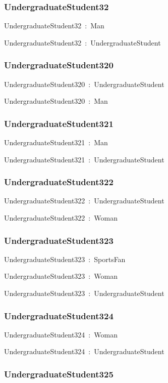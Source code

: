 \documentclass{article}
\begin{document}
\subsubsection*{UndergraduateStudent32}

UndergraduateStudent32~:~Man

UndergraduateStudent32~:~UndergraduateStudent

\subsubsection*{UndergraduateStudent320}

UndergraduateStudent320~:~UndergraduateStudent

UndergraduateStudent320~:~Man

\subsubsection*{UndergraduateStudent321}

UndergraduateStudent321~:~Man

UndergraduateStudent321~:~UndergraduateStudent

\subsubsection*{UndergraduateStudent322}

UndergraduateStudent322~:~UndergraduateStudent

UndergraduateStudent322~:~Woman

\subsubsection*{UndergraduateStudent323}

UndergraduateStudent323~:~SportsFan

UndergraduateStudent323~:~Woman

UndergraduateStudent323~:~UndergraduateStudent

\subsubsection*{UndergraduateStudent324}

UndergraduateStudent324~:~Woman

UndergraduateStudent324~:~UndergraduateStudent

\subsubsection*{UndergraduateStudent325}
\end{document}
